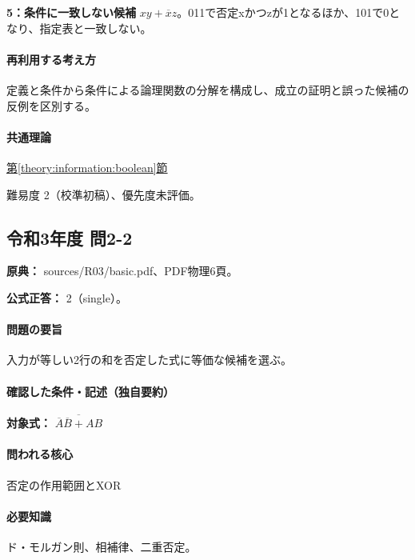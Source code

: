 \noindent\textbf{5：条件に一致しない候補} \(xy+\overline x z\)。011で否定xかつzが1となるほか、101で0となり、指定表と一致しない。\par

\paragraph{再利用する考え方} 定義と条件から条件による論理関数の分解を構成し、成立の証明と誤った候補の反例を区別する。

\paragraph{共通理論} \hyperref[theory:information:boolean]{第\ref*{theory:information:boolean}節}

\par 難易度 2（校準初稿）、優先度未評価。

\subsection{令和3年度 問2-2}
\label{q:r03-reg-basic-2-2}

\noindent\textbf{原典：} sources/R03/basic.pdf、PDF物理6頁。

\textbf{公式正答：} 2（single）。

\paragraph{問題の要旨} 入力が等しい2行の和を否定した式に等価な候補を選ぶ。

\paragraph{確認した条件・記述（独自要約）}\mbox{}\par

\noindent\textbf{対象式：} \(\overline{\overline A\overline B+AB}\)\par

\paragraph{問われる核心} 否定の作用範囲とXOR

\paragraph{必要知識} ド・モルガン則、相補律、二重否定。

